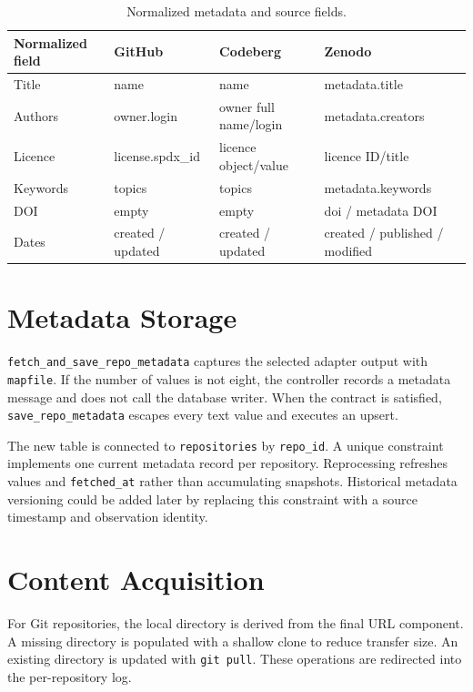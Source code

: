 \begin{table}[ht]
\centering
\caption{Normalized metadata and source fields.}
\label{tab:metadata-fields}
\small
\begin{tabularx}{\textwidth}{@{}lXXX@{}}
\toprule
Normalized field & GitHub & Codeberg & Zenodo\\
\midrule
Title & name & name & metadata.title\\
Authors & owner.login & owner full name/login & metadata.creators\\
Licence & license.spdx\_id & licence object/value & licence ID/title\\
Keywords & topics & topics & metadata.keywords\\
DOI & empty & empty & doi / metadata DOI\\
Dates & created / updated & created / updated & created / published / modified\\
\bottomrule
\end{tabularx}
\end{table}

\section{Metadata Storage}

\texttt{fetch\_and\_save\_repo\_metadata} captures the selected adapter output with \texttt{mapfile}. If the number of values is not eight, the controller records a metadata message and does not call the database writer. When the contract is satisfied, \texttt{save\_repo\_metadata} escapes every text value and executes an upsert.

The new table is connected to \texttt{repositories} by \texttt{repo\_id}. A unique constraint implements one current metadata record per repository. Reprocessing refreshes values and \texttt{fetched\_at} rather than accumulating snapshots. Historical metadata versioning could be added later by replacing this constraint with a source timestamp and observation identity.

\section{Content Acquisition}

For Git repositories, the local directory is derived from the final URL component. A missing directory is populated with a shallow clone to reduce transfer size. An existing directory is updated with \texttt{git pull}. These operations are redirected into the per-repository log.

